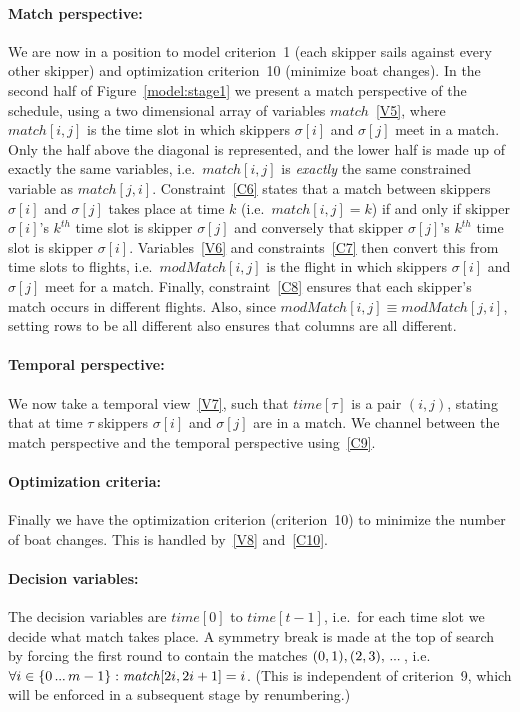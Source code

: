\documentclass{llncs}
\newcommand{\match}{\mathit{match}}
\newcommand{\modMatch}{\mathit{modMatch}}
\newcommand{\timeVar}{\mathit{time}}
\newcommand\nldots{\,\hbox to 0.8em{.\hss.\hss.}\,}
\begin{document}
\paragraph{Match perspective:} We are now in a position to model criterion~1 (each skipper sails
against every other skipper) and optimization criterion~10 (minimize boat changes).  In the second
half of Figure~\ref{model:stage1} we present a match perspective of the schedule, using a two
dimensional array of variables $\match$~\eqref{V5}, where $\match[{i,j}]$ is the time slot in which
skippers $\sigma[{i}]$ and $\sigma[{j}]$ meet in a match. Only the half above the diagonal is
represented, and the lower half is made up of exactly the same variables, i.e.\ $\match[{i,j}]$ is
\emph{exactly} the same constrained variable as $\match[{j,i}]$. Constraint~\eqref{C6} states that
a match between skippers $\sigma[{i}]$ and $\sigma[{j}]$ takes place at time $k$ (i.e.\
$\match[{i,j}] = k$) if and only if  skipper $\sigma[{i}]$'s $k^{th}$ time slot is skipper
$\sigma[{j}]$ and conversely that skipper $\sigma[{j}]$'s $k^{th}$ time slot is skipper
$\sigma[{i}]$. Variables~\eqref{V6} and constraints~\eqref{C7} then convert this from time slots to
flights, i.e.\ $\modMatch[{i,j}]$ is the flight in which skippers $\sigma[{i}]$ and $\sigma[{j}]$
meet for a match. Finally, constraint~\eqref{C8} ensures that each skipper's match occurs in
different flights. Also, since $\modMatch[{i,j}] \equiv \modMatch[{j,i}]$, setting rows to be all
different also ensures that columns are all different.

\paragraph{Temporal perspective:} We now take a temporal view~\eqref{V7}, such that
$\timeVar[{\tau}]$ is a pair $(i,j)$, stating that at time $\tau$ skippers $\sigma[{i}]$ and
$\sigma[{j}]$ are in a match. We channel between the match perspective and the temporal perspective
using~\eqref{C9}.

\paragraph{Optimization criteria:} Finally we have the optimization criterion (criterion~10) to
minimize the number of boat changes. This is handled by~\eqref{V8} and~\eqref{C10}.

\paragraph{Decision variables:} The decision variables are $\timeVar[{0}]$ to $\timeVar[{t-1}]$,
i.e.\ for each time slot we decide what match takes place. A symmetry break is made at the top of
search by forcing the first round to contain the matches $(0,1), (2,3), \nldots$, i.e.\ $\forall i
\in \{0 \nldots {m-1}\} : \match[{2i, 2i+1}] = i$. (This is independent of criterion~9, which will
be enforced in a subsequent stage by renumbering.)
\end{document}
